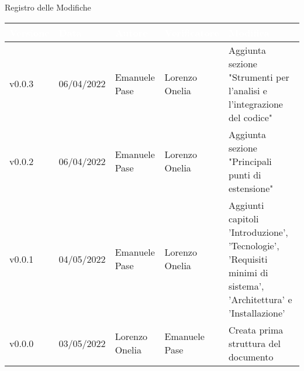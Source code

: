 \begin{center}
  \huge{Registro delle Modifiche}
\end{center}
\renewcommand\arraystretch{1,5}
{\centering
\begin{longtable}{|C{1.8cm}|C{2.1cm}|C{2cm}|C{2.4cm}|L{4.4cm}|}
  \hline
  \textcolor[HTML]{FFFFFF}{\textbf{Versione}} & \textcolor[HTML]{FFFFFF}{\textbf{Data}} & \textcolor[HTML]{FFFFFF}{\textbf{Autore}}  & \textcolor[HTML]{FFFFFF}{\textbf{Verificatore}} & \textcolor[HTML]{FFFFFF}{\textbf{Modifica}}    \\ \hline
  v0.0.3        & 06/04/2022    & Emanuele Pase   &  Lorenzo Onelia  & Aggiunta sezione "Strumenti per l’analisi e l’integrazione del codice" \\ \hline
  v0.0.2        & 06/04/2022    & Emanuele Pase   &  Lorenzo Onelia  & Aggiunta sezione "Principali punti di estensione" \\ \hline
  v0.0.1       & 04/05/2022    & Emanuele Pase   &   Lorenzo Onelia   & Aggiunti capitoli 'Introduzione', 'Tecnologie', 'Requisiti minimi di sistema', 'Architettura' e 'Installazione'\\ \hline
  v0.0.0        & 03/05/2022    & Lorenzo Onelia   & Emanuele Pase   & Creata prima struttura del documento \\ \hline
\end{longtable}}

\renewcommand\arraystretch{1}
